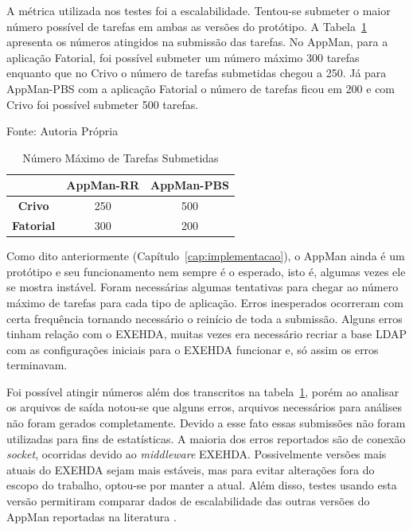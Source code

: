 A métrica utilizada nos testes foi a escalabilidade. Tentou-se submeter o maior número possível de tarefas em ambas as versões do protótipo. A Tabela~\ref{tab:num_max_tarefas} apresenta os números atingidos na submissão das tarefas. No AppMan, para a aplicação Fatorial, foi possível submeter um número máximo 300 tarefas enquanto que no Crivo o número de tarefas submetidas chegou a 250. Já para AppMan-PBS com a aplicação Fatorial o número de tarefas ficou em 200 e com Crivo foi possível submeter 500 tarefas.

\begin{table}[hbtp]
\begin{center}
\caption{Número Máximo de Tarefas Submetidas}
\begin{center}
	Fonte: Autoria Própria
\end{center}
\label{tab:num_max_tarefas}
\begin{tabular}{c|c|c}
	\hline
		& {\bf AppMan-RR} & {\bf AppMan-PBS}\\
	\hline
	{\bf Crivo} & 250 & 500\\ \hline
	\textbf{Fatorial} & 300 & 200\\ \hline
\end{tabular}
\end{center}
\end{table}

Como dito anteriormente (Capítulo~\ref{cap:implementacao}), o AppMan ainda é um protótipo e seu funcionamento nem sempre é o esperado, isto é, algumas vezes ele se mostra instável. Foram necessárias algumas tentativas para chegar ao número máximo de tarefas para cada tipo de aplicação. Erros inesperados ocorreram com certa frequência tornando necessário o reinício de toda a submissão. Alguns erros tinham relação com o EXEHDA, muitas vezes era necessário recriar a base LDAP com as configurações iniciais para o EXEHDA funcionar e, só assim os erros terminavam.

Foi possível atingir números além dos transcritos na tabela~\ref{tab:num_max_tarefas}, porém ao analisar os arquivos de saída notou-se que alguns erros, arquivos necessários para análises não foram gerados completamente. Devido a esse fato essas submissões não foram utilizadas para fins de estatísticas. A maioria dos erros reportados são de conexão \emph{socket}, ocorridas devido ao \emph{middleware} EXEHDA. Possivelmente versões mais atuais do EXEHDA sejam mais estáveis, mas para evitar alterações fora do escopo do trabalho, optou-se por manter a atual. Além disso, testes usando esta versão permitiram comparar dados de escalabilidade das outras versões do AppMan reportadas na literatura \cite{Mangan2006}.

